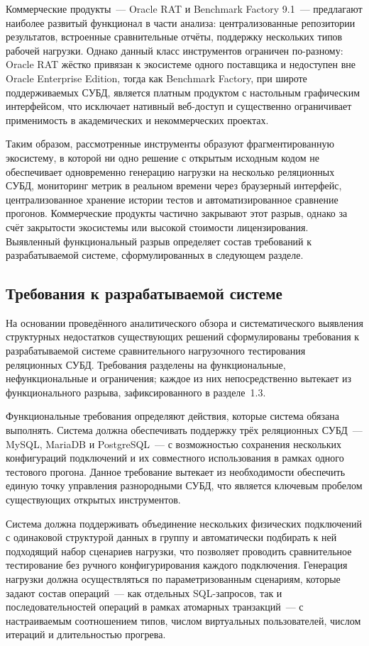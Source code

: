 Коммерческие продукты~--- Oracle RAT и Benchmark Factory 9.1~--- предлагают наиболее развитый функционал в части анализа: централизованные репозитории результатов, встроенные сравнительные отчёты, поддержку нескольких типов рабочей нагрузки. Однако данный класс инструментов ограничен по-разному: Oracle RAT жёстко привязан к экосистеме одного поставщика и недоступен вне Oracle Enterprise Edition, тогда как Benchmark Factory, при широте поддерживаемых СУБД, является платным продуктом с настольным графическим интерфейсом, что исключает нативный веб-доступ и существенно ограничивает применимость в академических и некоммерческих проектах.

Таким образом, рассмотренные инструменты образуют фрагментированную экосистему, в которой ни одно решение с открытым исходным кодом не обеспечивает одновременно генерацию нагрузки на несколько реляционных СУБД, мониторинг метрик в реальном времени через браузерный интерфейс, централизованное хранение истории тестов и автоматизированное сравнение прогонов. Коммерческие продукты частично закрывают этот разрыв, однако за счёт закрытости экосистемы или высокой стоимости лицензирования. Выявленный функциональный разрыв определяет состав требований к разрабатываемой системе, сформулированных в следующем разделе.

\subsection{Требования к разрабатываемой системе}

На основании проведённого аналитического обзора и систематического выявления структурных недостатков существующих решений сформулированы требования к разрабатываемой системе сравнительного нагрузочного тестирования реляционных СУБД. Требования разделены на функциональные, нефункциональные и ограничения; каждое из них непосредственно вытекает из функционального разрыва, зафиксированного в разделе~1.3.

Функциональные требования определяют действия, которые система обязана выполнять. Система должна обеспечивать поддержку трёх реляционных СУБД~--- MySQL, MariaDB и PostgreSQL~--- с возможностью сохранения нескольких конфигураций подключений и их совместного использования в рамках одного тестового прогона. Данное требование вытекает из необходимости обеспечить единую точку управления разнородными СУБД, что является ключевым пробелом существующих открытых инструментов.

Система должна поддерживать объединение нескольких физических подключений с одинаковой структурой данных в группу и автоматически подбирать к ней подходящий набор сценариев нагрузки, что позволяет проводить сравнительное тестирование без ручного конфигурирования каждого подключения. Генерация нагрузки должна осуществляться по параметризованным сценариям, которые задают состав операций~--- как отдельных SQL-запросов, так и последовательностей операций в рамках атомарных транзакций~--- с настраиваемым соотношением типов, числом виртуальных пользователей, числом итераций и длительностью прогрева.

